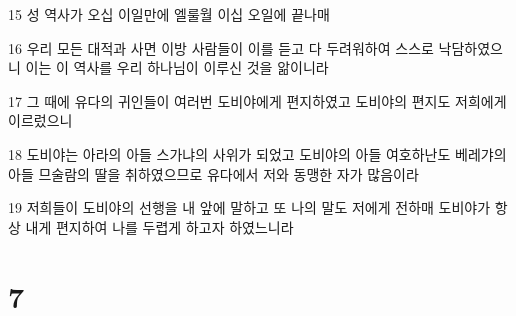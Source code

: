 \par 15 성 역사가 오십 이일만에 엘룰월 이십 오일에 끝나매
\par 16 우리 모든 대적과 사면 이방 사람들이 이를 듣고 다 두려워하여 스스로 낙담하였으니 이는 이 역사를 우리 하나님이 이루신 것을 앎이니라
\par 17 그 때에 유다의 귀인들이 여러번 도비야에게 편지하였고 도비야의 편지도 저희에게 이르렀으니
\par 18 도비야는 아라의 아들 스가냐의 사위가 되었고 도비야의 아들 여호하난도 베레갸의 아들 므술람의 딸을 취하였으므로 유다에서 저와 동맹한 자가 많음이라
\par 19 저희들이 도비야의 선행을 내 앞에 말하고 또 나의 말도 저에게 전하매 도비야가 항상 내게 편지하여 나를 두렵게 하고자 하였느니라

\chapter{7}

